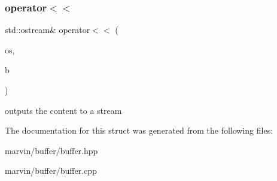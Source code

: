 \subsubsection{\texorpdfstring{operator$<$$<$}{operator<<}}
{\footnotesize\ttfamily std\+::ostream\& operator$<$$<$ (\begin{DoxyParamCaption}\item[{std\+::ostream \&}]{os,  }\item[{\hyperlink{struct_m_buffer}{M\+Buffer} \&}]{b }\end{DoxyParamCaption})\hspace{0.3cm}{\ttfamily [friend]}}

outputs the content to a stream 

The documentation for this struct was generated from the following files\+:\begin{DoxyCompactItemize}
\item 
marvin/buffer/buffer.\+hpp\item 
marvin/buffer/buffer.\+cpp\end{DoxyCompactItemize}

